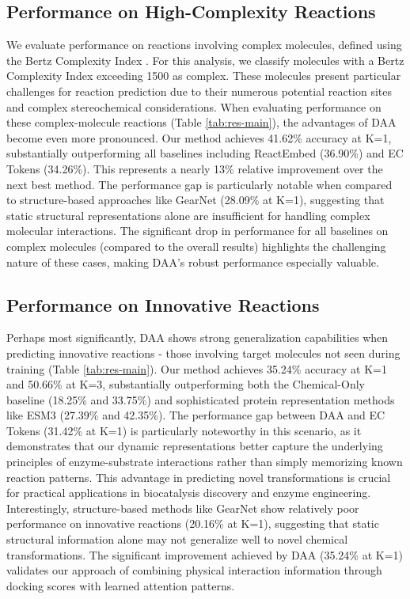 \documentclass[sigconf]{acmart}
\begin{document}
\subsection{Performance on High-Complexity Reactions}
We evaluate performance on reactions involving complex molecules, defined using the Bertz Complexity Index \cite{bertz1981first}. For this analysis, we classify molecules with a Bertz Complexity Index exceeding 1500 as complex. These molecules present particular challenges for reaction prediction due to their numerous potential reaction sites and complex stereochemical considerations. When evaluating performance on these complex-molecule reactions (Table \ref{tab:res-main}), the advantages of DAA become even more pronounced. Our method achieves 41.62\% accuracy at K=1, substantially outperforming all baselines including ReactEmbed (36.90\%) and EC Tokens (34.26\%). This represents a nearly 13\% relative improvement over the next best method. The performance gap is particularly notable when compared to structure-based approaches like GearNet (28.09\% at K=1), suggesting that static structural representations alone are insufficient for handling complex molecular interactions. The significant drop in performance for all baselines on complex molecules (compared to the overall results) highlights the challenging nature of these cases, making DAA's robust performance especially valuable.

\subsection{Performance on Innovative Reactions}

Perhaps most significantly, DAA shows strong generalization capabilities when predicting innovative reactions - those involving target molecules not seen during training (Table \ref{tab:res-main}). Our method achieves 35.24\% accuracy at K=1 and 50.66\% at K=3, substantially outperforming both the Chemical-Only baseline (18.25\% and 33.75\%) and sophisticated protein representation methods like ESM3 (27.39\% and 42.35\%).
The performance gap between DAA and EC Tokens (31.42\% at K=1) is particularly noteworthy in this scenario, as it demonstrates that our dynamic representations better capture the underlying principles of enzyme-substrate interactions rather than simply memorizing known reaction patterns. This advantage in predicting novel transformations is crucial for practical applications in biocatalysis discovery and enzyme engineering.
Interestingly, structure-based methods like GearNet show relatively poor performance on innovative reactions (20.16\% at K=1), suggesting that static structural information alone may not generalize well to novel chemical transformations. The significant improvement achieved by DAA (35.24\% at K=1) validates our approach of combining physical interaction information through docking scores with learned attention patterns.
\end{document}

